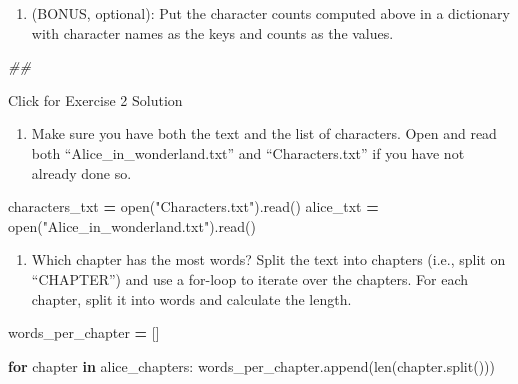 \documentclass[
]{book}
\newenvironment{Shaded}{\begin{snugshade}}{\end{snugshade}}
\newcommand{\BuiltInTok}[1]{#1}
\newcommand{\CommentTok}[1]{\textcolor[rgb]{0.56,0.35,0.01}{\textit{#1}}}
\newcommand{\ControlFlowTok}[1]{\textcolor[rgb]{0.13,0.29,0.53}{\textbf{#1}}}
\newcommand{\KeywordTok}[1]{\textcolor[rgb]{0.13,0.29,0.53}{\textbf{#1}}}
\newcommand{\NormalTok}[1]{#1}
\newcommand{\OperatorTok}[1]{\textcolor[rgb]{0.81,0.36,0.00}{\textbf{#1}}}
\newcommand{\StringTok}[1]{\textcolor[rgb]{0.31,0.60,0.02}{#1}}
\providecommand{\tightlist}{%
  \setlength{\itemsep}{0pt}\setlength{\parskip}{0pt}}
\begin{document}
\begin{enumerate}
\def\labelenumi{\arabic{enumi}.}
\setcounter{enumi}{3}
\tightlist
\item
  (BONUS, optional): Put the character counts computed
  above in a dictionary with character names as the keys and
  counts as the values.
\end{enumerate}

\begin{Shaded}
\begin{Highlighting}[]
\CommentTok{\#\#}
\end{Highlighting}
\end{Shaded}

{Click for Exercise 2 Solution}

\begin{alert}

\begin{enumerate}
\def\labelenumi{\arabic{enumi}.}
\tightlist
\item
  Make sure you have both the text and the list of characters.
  Open and read both ``Alice\_in\_wonderland.txt'' and ``Characters.txt'' if you have not already done so.
\end{enumerate}

\begin{Shaded}
\begin{Highlighting}[]
\NormalTok{characters\_txt }\OperatorTok{=} \BuiltInTok{open}\NormalTok{(}\StringTok{"Characters.txt"}\NormalTok{).read()}
\NormalTok{alice\_txt }\OperatorTok{=} \BuiltInTok{open}\NormalTok{(}\StringTok{"Alice\_in\_wonderland.txt"}\NormalTok{).read()}
\end{Highlighting}
\end{Shaded}

\begin{enumerate}
\def\labelenumi{\arabic{enumi}.}
\setcounter{enumi}{1}
\tightlist
\item
  Which chapter has the most words?
  Split the text into chapters (i.e., split on ``CHAPTER'') and use a for-loop to iterate over the chapters.
  For each chapter, split it into words and calculate the length.
\end{enumerate}

\begin{Shaded}
\begin{Highlighting}[]
\NormalTok{words\_per\_chapter }\OperatorTok{=}\NormalTok{ []}

\ControlFlowTok{for}\NormalTok{ chapter }\KeywordTok{in}\NormalTok{ alice\_chapters:}
\NormalTok{    words\_per\_chapter.append(}\BuiltInTok{len}\NormalTok{(chapter.split()))}


\end{Highlighting}
\end{Shaded}
\end{alert}
\end{document}
